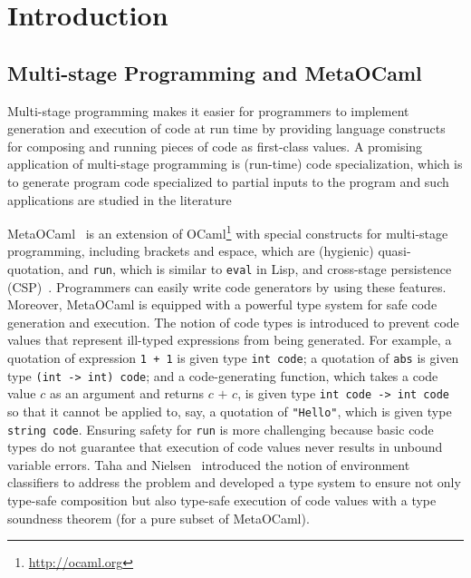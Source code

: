 
\section{Introduction}
\label{sec:intro}

\subsection{Multi-stage Programming and MetaOCaml}

Multi-stage programming makes it easier for programmers to implement
generation and execution of code at run time by providing language
constructs for composing and running pieces of code as first-class
values.  A promising application of multi-stage programming is
(run-time) code specialization, which is to generate program code
specialized to partial inputs to the program and such applications are
studied in the literature~\cite{8384206,taha2007gentle}  

MetaOCaml~\cite{calcagno2003implementing,oleg2014} is an extension of
OCaml\footnote{\url{http://ocaml.org}} with special constructs for
multi-stage programming, including brackets and espace, which are
(hygienic) quasi-quotation, and \texttt{run}, which is similar to
\texttt{eval} in Lisp, and cross-stage persistence
(CSP)~\cite{MetaML}.  Programmers can easily write code generators by
using these features.  Moreover, MetaOCaml is equipped with a powerful
type system for safe code generation and execution.  The notion of
code types is introduced to prevent code values that represent
ill-typed expressions from being generated.  For example, a quotation
of expression \texttt{1 + 1} is given type \texttt{int code}; a
quotation of \texttt{abs} is given type \texttt{(int -> int) code};
and a code-generating function, which takes a code value \(c\) as an
argument and returns \(c \texttt{ + } c\), is given type \texttt{int
  code -> int code} so that it cannot be applied to, say, a quotation
of \texttt{"Hello"}, which is given type \texttt{string
  code}.  Ensuring safety for \verb|run| is more challenging because
basic code types do not guarantee that execution of code values never
results in unbound variable errors.  Taha and
Nielsen~\cite{taha2003environment} introduced the notion of
environment classifiers to address the problem and developed a type
system to ensure not only type-safe composition but also type-safe
execution of code values with a type soundness theorem (for a pure
subset of MetaOCaml).



